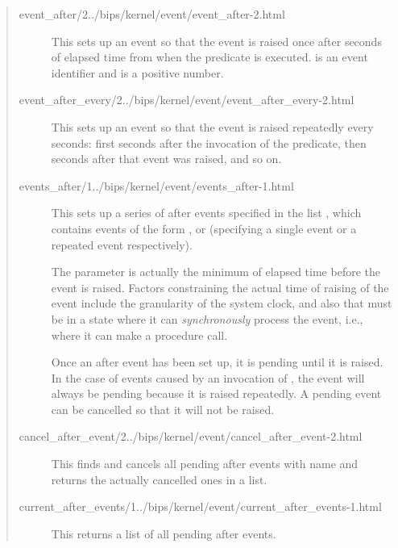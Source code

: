 \begin{quote}
\begin{description}
\item[%
{event_after/2}{../bips/kernel/event/event_after-2.html}]
This sets up an event  so that the event is raised once after
 seconds
of elapsed time from when the predicate is executed.  is an event
identifier and  is a positive number.

\item[%
{event_after_every/2}{../bips/kernel/event/event_after_every-2.html}]
This sets up an event  so
that the event is raised repeatedly every  seconds: first
 seconds after the invocation of the predicate, then 
seconds after that event was raised, and so on.

\item[%
{events_after/1}{../bips/kernel/event/events_after-1.html}]
This sets up a series of after events specified in the list ,
which contains events of the form , or
 (specifying a single
event or a repeated event respectively).

The  parameter is actually the minimum of elapsed time before the
event is raised. Factors constraining the actual time of raising of the
event include the granularity of the system clock, and also that {\eclipse}
must be in a state where it can \emph{synchronously} process the event, i.e.,
where it can make a procedure call.

Once an after event has been set up, it is pending until it is raised. In
the case of events caused by an invocation of ,
the event will always be pending
because it is raised repeatedly. A pending event can be cancelled so that
it will not be raised.


\item[%
{cancel_after_event/2}{../bips/kernel/event/cancel_after_event-2.html}]
This finds and cancels all pending after events with name  and
returns the actually cancelled ones in a list.

\item[%
{current_after_events/1}{../bips/kernel/event/current_after_events-1.html}]
This returns a list of all pending after events.
\end{description}
\end{quote}

